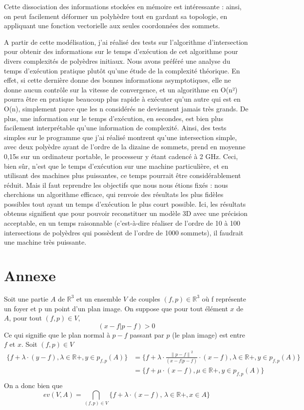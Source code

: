 \documentclass[a4paper]{article}
\newcommand{\norm}[1]{\left\lVert#1\right\rVert}
\begin{document}
      Cette dissociation des informations stockées en mémoire est intéressante : ainsi, on peut facilement déformer un polyhèdre tout en gardant sa topologie, en appliquant une fonction vectorielle aux seules coordonnées des sommets. 

      A partir de cette modélisation, j’ai réalisé des tests sur l’algorithme d’intersection pour obtenir des informations sur le temps d’exécution de cet algorithme pour divers complexités de polyèdres initiaux. Nous avons préféré une analyse du temps d’exécution pratique plutôt qu’une étude de la complexité théorique. En effet, si cette dernière donne des bonnes informations asymptotiques, elle ne donne aucun contrôle sur la vitesse de convergence, et un algorithme en O(n²) pourra être en pratique beaucoup plus rapide à exécuter qu’un autre qui est en O(n), simplement parce que les n considérés ne deviennent jamais très grands. De plus, une information sur le temps d’exécution, en secondes, est bien plus facilement interprétable qu’une information de complexité. Ainsi, des tests simples sur le programme que j’ai réalisé montrent qu’une intersection simple, avec deux polyèdre ayant de l’ordre de la dizaine de sommets, prend en moyenne 0,15s sur un ordinateur portable, le processeur y étant cadencé à 2 GHz. Ceci, bien sûr, n’est que le temps d’exécution sur une machine particulière, et en utilisant des machines plus puissantes, ce temps pourrait être considérablement réduit. Mais il faut reprendre les objectifs que nous nous étions fixés : nous cherchions un algorithme efficace, qui renvoie des résultats les plus fidèles possibles tout ayant un temps d’exécution le plus court possible. Ici, les résultats obtenus signifient que pour pouvoir reconstituer un modèle 3D avec une précision acceptable, en un temps raisonnable (c’est-à-dire réaliser de l’ordre de 10 à 100 intersections de polyèdres qui possèdent de l’ordre de 1000 sommets), il faudrait une machine très puissante.

  \appendix
  \section{Annexe}\label{AnnexeA}
    Soit une partie $A$ de $\mathbb{R}^3$ et un ensemble $V$ de couples $(f, p) \in \mathbb{R}^3$ où f représente un foyer et p un point d'un plan image. On suppose que pour tout élément $x$ de $A$, pour tout $(f, p) \in V$,  
    \[(x - f | p - f) > 0\]
    Ce qui signifie que le plan normal à $p - f$ passant par $p$ (le plan image) est entre $f$ et $x$.
    Soit $(f, p) \in V$
    \begin{align*}
      \{f + \lambda \cdot (y - f), \lambda \in \mathbb{R}+, y \in p_{f, p}(A)\}
      &= \{f + \lambda \cdot \frac{\norm{p - f}^2}{(x - f | p - f)} \cdot (x - f), \lambda \in \mathbb{R}+, y \in p_{f, p}(A)\}\\
      &= \{f + \mu \cdot (x - f), \mu \in \mathbb{R}+, y \in p_{f, p}(A)\}\\
    \end{align*}
    On a donc bien que
    \[
      ev(V, A) = \bigcap_{(f, p) \in V} \{f + \lambda \cdot (x - f), \, \lambda \in \mathbb{R}+, x \in A\}
    \]
\end{document}
